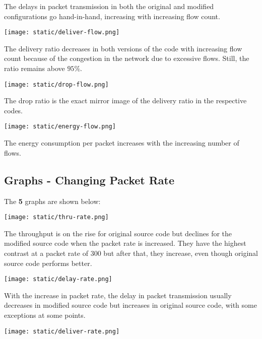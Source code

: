 \documentclass{article}
\begin{document}
The delays in packet transmission in both the original and modified configurations go hand-in-hand, increasing with increasing flow count.

\begin{center}
    \texttt{[image: static/deliver-flow.png]}
\end{center}

The delivery ratio decreases in both versions of the code with increasing flow count because of the congestion in the network due to excessive flows. Still, the ratio remains above $95\%$.

\begin{center}
    \texttt{[image: static/drop-flow.png]}
\end{center}

The drop ratio is the exact mirror image of the delivery ratio in the respective codes.

\begin{center}
    \texttt{[image: static/energy-flow.png]}
\end{center}

The energy consumption per packet increases with the increasing number of flows.

\subsection{Graphs - Changing Packet Rate}
The \textbf{5} graphs are shown below:

\begin{center}
    \texttt{[image: static/thru-rate.png]}
\end{center}

The throughput is on the rise for original source code but declines for the modified source code when the packet rate is increased. They have the highest contrast at a packet rate of $300$ but after that, they increase, even though original source code performs better.

\begin{center}
    \texttt{[image: static/delay-rate.png]}
\end{center}

With the increase in packet rate, the delay in packet transmission usually decreases in modified source code but increases in original source code, with some exceptions at some points.

\begin{center}
    \texttt{[image: static/deliver-rate.png]}
\end{center}
\end{document}
